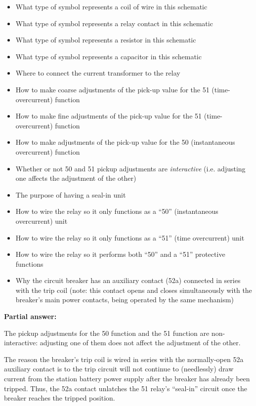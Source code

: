 \begin{itemize}
\item{} What type of symbol represents a coil of wire in this schematic
\item{} What type of symbol represents a relay contact in this schematic
\item{} What type of symbol represents a resistor in this schematic
\item{} What type of symbol represents a capacitor in this schematic
\item{} Where to connect the current transformer to the relay
\item{} How to make coarse adjustments of the pick-up value for the 51 (time-overcurrent) function
\item{} How to make fine adjustments of the pick-up value for the 51 (time-overcurrent) function
\item{} How to make adjustments of the pick-up value for the 50 (instantaneous overcurrent) function
\item{} Whether or not 50 and 51 pickup adjustments are {\it interactive} (i.e. adjusting one affects the adjustment of the other)
\item{} The purpose of having a seal-in unit
\item{} How to wire the relay so it only functions as a ``50'' (instantaneous overcurrent) unit
\item{} How to wire the relay so it only functions as a ``51'' (time overcurrent) unit
\item{} How to wire the relay so it performs both ``50'' and a ``51'' protective functions
\item{} Why the circuit breaker has an auxiliary contact (52a) connected in series with the trip coil (note: this contact opens and closes simultaneously with the breaker's main power contacts, being operated by the same mechanism)
\end{itemize}







\noindent
{\bf Partial answer:}

The pickup adjustments for the 50 function and the 51 function are non-interactive: adjusting one of them does not affect the adjustment of the other.

\vskip 10pt

The reason the breaker's trip coil is wired in series with the normally-open 52a auxiliary contact is to the trip circuit will not continue to (needlessly) draw current from the station battery power supply after the breaker has already been tripped.  Thus, the 52a contact unlatches the 51 relay's ``seal-in'' circuit once the breaker reaches the tripped position.

